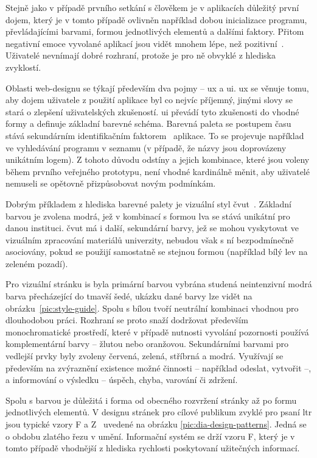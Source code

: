 Stejně jako v případě prvního setkání s člověkem je v aplikacích důležitý první dojem, který je v tomto případě ovlivněn například dobou inicializace programu, převládajícími barvami, formou jednotlivých elementů a dalšími faktory. Přitom negativní emoce vyvolané aplikací jsou vidět mnohem lépe, než pozitivní~\cite{tragicDesign}. Uživatelé nevnímají dobré rozhraní, protože je pro ně obvyklé z hlediska zvyklostí.

Oblasti web-designu se týkají především dva pojmy -- \gls{ux} a \gls{ui}. \gls{ux} se věnuje tomu, aby dojem uživatele z použití aplikace byl co nejvíc příjemný, jinými slovy se stará o zlepšení uživatelských zkušeností. \gls{ui} převádí tyto zkušenosti do vhodné formy a definuje základní barevné schéma. Barevná paleta se postupem času stává sekundárním identifikačním faktorem~\cite{colorTheory} aplikace. To se projevuje například ve vyhledávání programu v seznamu (v případě, že názvy jsou doprovázeny unikátním logem). Z tohoto důvodu odstíny a jejich kombinace, které jsou voleny během prvního veřejného prototypu, není vhodné kardinálně měnit, aby uživatelé nemuseli se opětovně přizpůsobovat novým podmínkám.

Dobrým příkladem z hlediska barevné palety je vizuální styl \gls{čvut}~\cite{cvutStyleGuide}. Základní barvou je zvolena modrá, jež v kombinací s formou lva se stává unikátní pro danou instituci. \gls{čvut} má i další, sekundární barvy, jež se mohou vyskytovat ve vizuálním zpracování materiálů univerzity, nebudou však s ní bezpodmínečně asociovány, pokud se použijí samostatně se stejnou formou (například bílý lev na zeleném pozadí).

Pro vizuální stránku \gls{is} byla primární barvou vybrána studená neintenzivní modrá barva přecházející do tmavší šedé, ukázku dané barvy lze vidět na obrázku~\ref{pic:style-guide}. Spolu s bílou tvoří neutrální kombinaci vhodnou pro dlouhodobou práci. Rozhraní se proto snaží dodržovat především monochromatické prostředí, které v případě nutnosti vyvolání pozornosti používá komplementární barvy -- žlutou nebo oranžovou. Sekundárními barvami pro vedlejší prvky byly zvoleny červená, zelená, stříbrná a modrá. Využívají se především na zvýraznění existence možné činnosti -- například odeslat, vytvořit --, a informování o výsledku -- úspěch, chyba, varování či zdržení.

Spolu s barvou je důležitá i forma od obecného rozvržení stránky až po formu jednotlivých elementů. V designu stránek pro cílové publikum zvyklé pro psaní \gls{ltr} jsou typické vzory F a Z~\cite{zfPatterns} uvedené na obrázku \ref{pic:dia-design-patterns}. Jedná se o obdobu zlatého řezu v umění. Informační systém se drží vzoru F, který je v tomto případě vhodnější z hlediska rychlosti poskytovaní užitečných informací.

